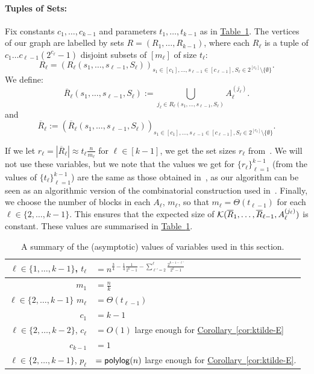 \documentclass{theoretics}
\newcommand{\cor}[1]{\hyperref[cor:#1]{Corollary~\ref*{cor:#1}}}
\newcommand{\tabl}[1]{\hyperref[tab:#1]{Table~\ref*{tab:#1}}}
\renewcommand{\>}{\rangle}
\newcommand{\<}{\langle}
\renewcommand{\(}{\left(}
\renewcommand{\)}{\right)}
\begin{document}
\paragraph{Tuples of Sets:} Fix constants $c_1,\dots,c_{k-1}$ and parameters $t_1,\dots,t_{k-1}$ as in \tabl{k-dist-setsizes}. The vertices of our graph are labelled by sets $R=(R_1,\dots,R_{k-1})$, where each $R_{\ell}$ is a tuple of $c_1\dots c_{\ell-1}(2^{c_{\ell}}-1)$ disjoint subsets of $[m_{\ell}]$ of size $t_\ell$:
$$R_{\ell}=(R_{\ell}(s_1,\dots,s_{\ell-1},S_{\ell}))_{s_1\in [c_1],\dots,s_{\ell-1}\in [c_{\ell-1}],S_{\ell}\in 2^{[c_{\ell}]}\setminus\{\emptyset\}}.$$
We define:
$$\overline{R}_{\ell}(s_1,\dots,s_{\ell-1},S_{\ell}):= 
\bigcup_{j_{\ell}\in R_{\ell}(s_1,\dots,s_{\ell-1},S_{\ell})}A_{\ell}^{(j_{\ell})}.$$
and
$$\overline{R}_{\ell}:=
(\overline{R}_{\ell}(s_1,\dots,s_{\ell-1},S_{\ell}))_{s_1\in [c_1],\dots,s_{\ell-1}\in [c_{\ell-1}],S_{\ell}\in 2^{[c_{\ell}]}\setminus\{\emptyset\}}.$$

If we let $r_{\ell}=|\overline{R}_{\ell}|\approx t_{\ell}\frac{n}{m_{\ell}}$ for $\ell\in [k-1]$, we get the set sizes $r_{\ell}$ from~\cite{belovs2012kDist}. We will not use these variables, but we note that the values we get for $\{r_{\ell}\}_{\ell=1}^{k-1}$ (from the values of $\{t_{\ell}\}_{\ell=1}^{k-1}$) are the same as those obtained in~\cite{belovs2012kDist}, as our algorithm can be seen as an algorithmic version of the combinatorial construction used in~\cite{belovs2012kDist}. Finally, we choose the number of blocks in each $A_{\ell}$, $m_{\ell}$, so that $m_{\ell}=\Theta(t_{\ell-1})$ for each $\ell\in \{2,\dots,k-1\}$. This ensures that the expected size of ${\cal K}(\overline{R}_1,\dots,\overline{R}_{\ell-1},A_{\ell}^{(j_{\ell})})$ is constant. These values are summarised in \tabl{k-dist-setsizes}.

\begin{table}
	\renewcommand{\arraystretch}{2}
	\centering
	\begin{tabular}{ |r|l|}
		\hline
		$\ell\in\{1,\dots,k-1\}$, $t_{\ell}$ & $=n^{\frac{3}{4}-\frac{1}{4}\frac{1}{2^k-1} - \sum_{\ell'=2}^{\ell}\frac{2^{k-1-\ell'}}{2^k-1}}$\\
		\hline
		$m_1$ & $=\frac{n}{k}$\\
		\hline
		$\ell\in\{2,\dots,k-1\}$ $m_{\ell}$ & $=\Theta(t_{\ell-1})$\\
		\hline
		$c_1$ & $=k-1$\\
		\hline
		$\ell\in\{2,\dots,k-2\}$, $c_{\ell}$ & $=O(1)$ large enough for \cor{ktilde-E}\\
		\hline
		$c_{k-1}$ & $=1$\\
		\hline
		$\ell\in\{2,\dots,k-1\}$, $p_{\ell}$ & $={\sf polylog}(n)$ large enough for \cor{ktilde-E}.\\
		\hline
	\end{tabular}
	\caption{A summary of the (asymptotic) values of variables used in this section.}\label{tab:k-dist-setsizes}
\end{table}
\end{document}
